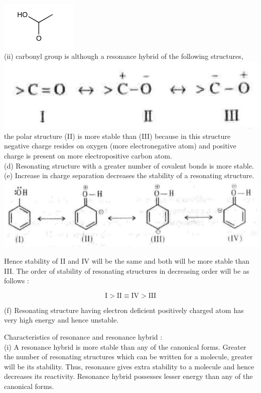 \documentclass[10pt]{article}
\begin{document}
\includegraphics{smile-d6862c9fb1969bf85b042654ccd8f7ed365926e2}\\
(ii) carbonyl group is although a resonance hybrid of the following structures,\\
\includegraphics[max width=\textwidth, center]{2025_01_28_8470952b98110cec3aabg-071}\\
the polar structure (II) is more stable than (III) because in this structure negative charge resides on oxygen (more electronegative atom) and positive charge is present on more electropositive carbon atom.\\
(d) Resonating structure with a greater number of covalent bonds is more stable.\\
(e) Increase in charge separation decreases the stability of a resonating structure.\\
\includegraphics[max width=\textwidth, center]{2025_01_28_8470952b98110cec3aabg-071(3)}

Hence stability of II and IV will be the same and both will be more stable than III. The order of stability of resonating structures in decreasing order will be as follows :

$$
\mathrm{I}>\mathrm{II} \equiv \mathrm{IV}>\mathrm{III}
$$

(f) Resonating structure having electron deficient positively charged atom has very high energy and hence unstable.

Characteristics of resonance and resonance hybrid :\\
(i) A resonance hybrid is more stable than any of the canonical forms. Greater the number of resonating structures which can be written for a molecule, greater will be its stability. Thus, resonance gives extra stability to a molecule and hence decreases its reactivity. Resonance hybrid possesses lesser energy than any of the canonical forms.
\end{document}
